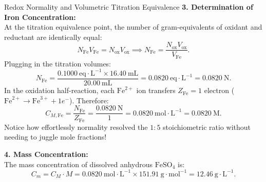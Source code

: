 \begin{workedexample}{Redox Normality and Volumetric Titration Equivalence}
\textbf{3. Determination of Iron Concentration:}\\
At the titration equivalence point, the number of gram-equivalents of oxidant and reductant are identically equal:
\[
N_{\text{Fe}} V_{\text{Fe}} = N_{\text{ox}} V_{\text{ox}} \implies N_{\text{Fe}} = \frac{N_{\text{ox}} V_{\text{ox}}}{V_{\text{Fe}}}.
\]
Plugging in the titration volumes:
\[
N_{\text{Fe}} = \frac{0.1000\ \mathrm{eq\cdot L^{-1}} \times 16.40\ \mathrm{mL}}{20.00\ \mathrm{mL}} = \mathbf{0.0820\ \mathrm{eq\cdot L^{-1}} = 0.0820\ \mathrm{N}}.
\]
In the oxidation half-reaction, each $\mathrm{Fe}^{2+}$ ion transfers $Z_{\text{Fe}} = 1$ electron ($\mathrm{Fe}^{2+} \to \mathrm{Fe}^{3+} + 1e^-$). Therefore:
\[
C_{M,\text{Fe}} = \frac{N_{\text{Fe}}}{Z_{\text{Fe}}} = \frac{0.0820\ \mathrm{N}}{1} = \mathbf{0.0820\ \mathrm{mol\cdot L^{-1}} = 0.0820\ \mathrm{M}}.
\]
Notice how effortlessly normality resolved the $1:5$ stoichiometric ratio without needing to juggle mole fractions!

\textbf{4. Mass Concentration:}\\
The mass concentration of dissolved anhydrous $\mathrm{FeSO_4}$ is:
\[
C_{m} = C_M \cdot M = 0.0820\ \mathrm{mol\cdot L^{-1}} \times 151.91\ \mathrm{g\cdot mol^{-1}} = \mathbf{12.46\ \mathrm{g\cdot L^{-1}}}.
\]
\end{workedexample}

